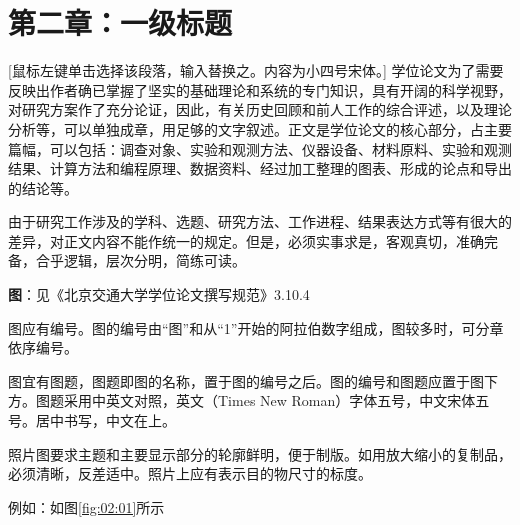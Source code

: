 \chapter{第二章：一级标题}
\label{cha:chap2}

[鼠标左键单击选择该段落，输入替换之。内容为小四号宋体。] 学位论文为了需要反映出作者确已掌握了坚实的基础理论和系统的专门知识，具有开阔的科学视野，对研究方案作了充分论证，因此，有关历史回顾和前人工作的综合评述，以及理论分析等，可以单独成章，用足够的文字叙述。正文是学位论文的核心部分，占主要篇幅，可以包括：调查对象、实验和观测方法、仪器设备、材料原料、实验和观测结果、计算方法和编程原理、数据资料、经过加工整理的图表、形成的论点和导出的结论等。


由于研究工作涉及的学科、选题、研究方法、工作进程、结果表达方式等有很大的差异，对正文内容不能作统一的规定。但是，必须实事求是，客观真切，准确完备，合乎逻辑，层次分明，简练可读。


\textbf{图}：见《北京交通大学学位论文撰写规范》3.10.4

图应有编号。图的编号由“图”和从“1”开始的阿拉伯数字组成，图较多时，可分章依序编号。

图宜有图题，图题即图的名称，置于图的编号之后。图的编号和图题应置于图下方。图题采用中英文对照，英文（Times New Roman）字体五号，中文宋体五号。居中书写，中文在上。

照片图要求主题和主要显示部分的轮廓鲜明，便于制版。如用放大缩小的复制品，必须清晰，反差适中。照片上应有表示目的物尺寸的标度。

例如：如图\ref{fig:02:01}所示

